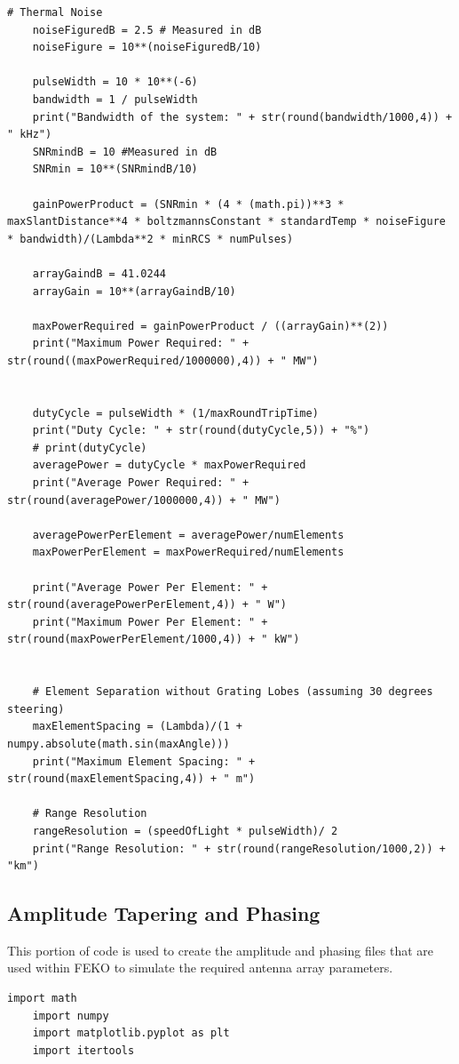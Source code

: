 \documentclass[11pt]{witseiepaper}
\begin{document}
\begin{bibunit}[witseie]
\begin{lstlisting}[breaklines=true, postbreak=\mbox{\textcolor{red}{$\hookrightarrow$}\space}]
    # Thermal Noise
    noiseFiguredB = 2.5 # Measured in dB
    noiseFigure = 10**(noiseFiguredB/10)
    
    pulseWidth = 10 * 10**(-6)
    bandwidth = 1 / pulseWidth
    print("Bandwidth of the system: " + str(round(bandwidth/1000,4)) + " kHz")
    SNRmindB = 10 #Measured in dB
    SNRmin = 10**(SNRmindB/10)
    
    gainPowerProduct = (SNRmin * (4 * (math.pi))**3 * maxSlantDistance**4 * boltzmannsConstant * standardTemp * noiseFigure * bandwidth)/(Lambda**2 * minRCS * numPulses)
    
    arrayGaindB = 41.0244
    arrayGain = 10**(arrayGaindB/10)
    
    maxPowerRequired = gainPowerProduct / ((arrayGain)**(2))
    print("Maximum Power Required: " + str(round((maxPowerRequired/1000000),4)) + " MW")
    
    
    dutyCycle = pulseWidth * (1/maxRoundTripTime)
    print("Duty Cycle: " + str(round(dutyCycle,5)) + "%")
    # print(dutyCycle)
    averagePower = dutyCycle * maxPowerRequired
    print("Average Power Required: " + str(round(averagePower/1000000,4)) + " MW")
    
    averagePowerPerElement = averagePower/numElements
    maxPowerPerElement = maxPowerRequired/numElements
    
    print("Average Power Per Element: " + str(round(averagePowerPerElement,4)) + " W")
    print("Maximum Power Per Element: " + str(round(maxPowerPerElement/1000,4)) + " kW")
    
    
    # Element Separation without Grating Lobes (assuming 30 degrees steering)
    maxElementSpacing = (Lambda)/(1 + numpy.absolute(math.sin(maxAngle)))
    print("Maximum Element Spacing: " + str(round(maxElementSpacing,4)) + " m")
    
    # Range Resolution
    rangeResolution = (speedOfLight * pulseWidth)/ 2
    print("Range Resolution: " + str(round(rangeResolution/1000,2)) + "km")
\end{lstlisting}
   

\subsection{Amplitude Tapering and Phasing} \label{sec:AmplitudeTaperingandPhasing}
This portion of code is used to create the amplitude and phasing files that are used within FEKO to simulate the required antenna array parameters. 

\begin{lstlisting}[breaklines=true, postbreak=\mbox{\textcolor{red}{$\hookrightarrow$}\space}]
    import math
    import numpy
    import matplotlib.pyplot as plt
    import itertools
    

\end{lstlisting}
\end{bibunit}
\end{document}
